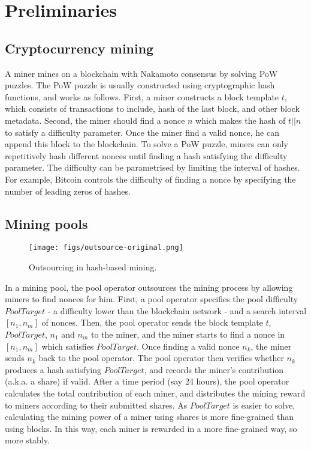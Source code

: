 \section{Preliminaries}
\label{sec:preliminaries}

\subsection{Cryptocurrency mining}


A miner mines on a blockchain with Nakamoto consensus by solving PoW puzzles.
The PoW puzzle is usually constructed using cryptographic hash functions, and works as follows.
First, a miner constructs a block template $t$, which consists of transactions to include, hash of the last block, and other block metadata.
Second, the miner should find a nonce $n$ which makes the hash of $t || n$ to satisfy a difficulty parameter.
Once the miner find a valid nonce, he can append this block to the blockchain.
To solve a PoW puzzle, miners can only repetitively hash different nonces until finding a hash satisfying the difficulty parameter.
The difficulty can be parametrised by limiting the interval of hashes.
For example, Bitcoin controls the difficulty of finding a nonce by specifying the number of leading zeros of hashes.





\subsection{Mining pools}

\begin{figure}[htp]
    \centering
    \texttt{[image: figs/outsource-original.png]}
    \caption{Outsourcing in hash-based mining.}
    \label{fig:outsource-original}
\end{figure}

In a mining pool, the pool operator outsources the mining process by allowing miners to find nonces for him.
First, a pool operator specifies the pool difficulty $PoolTarget$ - a difficulty lower than the blockchain network - and a search interval $[n_1, n_m]$ of nonces.
Then, the pool operator sends the block template $t$, $PoolTarget$, $n_1$ and $n_m$ to the miner, and the miner starts to find a nonce in $[n_1, n_m]$ which satisfies $PoolTarget$.
Once finding a valid nonce $n_k$, the miner sends $n_k$ back to the pool operator.
The pool operator then verifies whether $n_k$ produces a hash satisfying $PoolTarget$, and records the miner's contribution (a.k.a. a share) if valid.
After a time period (say 24 hours), the pool operator calculates the total contribution of each miner, and distributes the mining reward to miners according to their submitted shares.
As $PoolTarget$ is easier to solve, calculating the mining power of a miner using shares is more fine-grained than using blocks.
In this way, each miner is rewarded in a more fine-grained way, so more stably.


